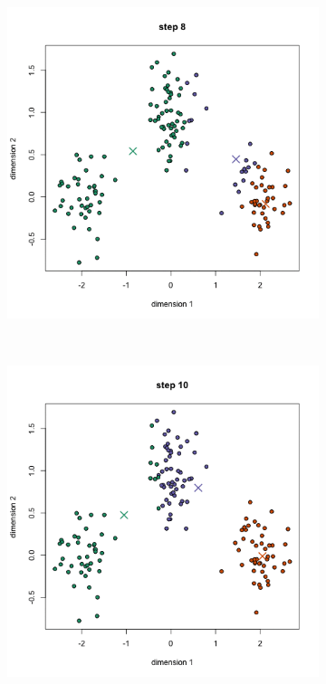 \documentclass[a4paper, 14pt]{extarticle}
\begin{document}
\begin{figure}
	\begin{subfigure}[b]{0.3\textwidth}
		\includegraphics[width=\textwidth]{k_3}
		\caption{}
	\end{subfigure}
	~
	\begin{subfigure}[b]{0.3\textwidth}
		\includegraphics[width=\textwidth]{k_4}

\end{subfigure}
\end{figure}
\end{document}
